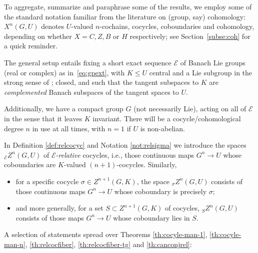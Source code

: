 \documentclass[10pt,a4paper]{amsart}
\numberwithin{equation}{section}
\newcommand\cE{{\mathcal E}}
\begin{document}
To aggregate, summarize and paraphrase some of the results, we employ some of the standard notation familiar from the literature on (group, say) cohomology: $X^{n}(G,U)$ denotes $U$-valued $n$-cochains, cocycles, coboundaries and cohomology, depending on whether $X = C,Z,B$ or $H$ respectively; see Section~\ref{subse:coh} for a quick reminder.

The general setup entails fixing a short exact sequence $\cE$ of Banach Lie groups (real or complex) as in~\eqref{eq:gpext}, with $K\le U$ central and a Lie subgroup in the strong sense of \cite[Section~III.1.3, Definition~3]{bourb-lie-13}; closed, and such that the tangent subspaces to $K$ are {\it complemented} Banach subspaces of the tangent spaces to $U$.

Additionally, we have a compact group $G$ (not necessarily Lie), acting on all of $\cE$ in the sense that it leaves $K$ invariant. There will be a cocycle/cohomological degree $n$ in use at all times, with $n=1$ if $U$ is non-abelian.

In Definition \ref{def:relcocyc} and Notation \ref{not:relsigma} we introduce the spaces ${}_{\cE}Z^n(G,U)$ of {\it $\cE$-relative} cocycles, i.e., those continuous maps $G^n\to U$ whose coboundaries are $K$-valued $(n+1)$-cocycles. Similarly,
\begin{itemize}\itemsep=0pt
\item for a specific cocycle $\sigma\in Z^{n+1}(G,K)$, the space ${}_{\sigma}Z^n(G,U)$ consists of those continuous maps $G^n\to U$ whose coboundary is precisely $\sigma$;
\item and more generally, for a set $S\subset Z^{n+1}(G,K)$ of cocycles, ${}_{S}Z^n(G,U)$ consists of those maps $G^n\to U$ whose coboundary lies in $S$.
\end{itemize}

A selection of statements spread over Theorems \ref{th:cocyle-man-1}, \ref{th:cocyle-man-n}, \ref{th:relcocfiber}, \ref{th:relcocfiber-tg} and \ref{th:canconjrel}:
\end{document}

